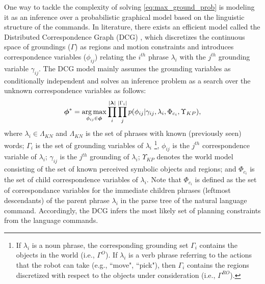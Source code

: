 One way to tackle the complexity of solving \eqref{eq:max_ground_prob} is modeling it as an inference over a probabilistic graphical model based on the linguistic structure of the commands. In literature, there exists an efficient model called the Distributed Correspondence Graph (DCG) \cite{dcg}, which discretizes the continuous space of groundings ($\Gamma$) as regions and motion constraints and introduces correspondence variables ($\phi_{ij}$) relating the $i^{th}$ phrase $\lambda_i$ with the $j^{th}$ grounding variable $\gamma_{ij}$. The DCG model mainly assumes the grounding variables as conditionally independent and solves an inference problem as a search over the unknown correspondence variables as follows: 
\begin{equation}
\label{eq:dcg_factored1}
\begin{split}
\boldsymbol{\phi}^* = \operatorname*{\arg\max}_{\phi_{ij} \in \boldsymbol{\phi}} \prod_{i}^{| \boldsymbol{\lambda}|} \prod_{j}^{|\Gamma_i|} p(\phi_{ij}|\gamma_{ij},\lambda_i, \Phi_{c_{i}}, \Upsilon_{KP}),
\end{split}
\end{equation}
where $\lambda_i \in \Lambda_{KN}$ and $\Lambda_{KN}$ is the set of phrases with known (previously seen) words; $\Gamma_i$ is the set of grounding variables of $\lambda_i$ \footnote{If $\lambda_i$ is a noun phrase, the corresponding grounding set $\Gamma_i$ contains the objects in the world (i.e., $\Gamma^O$). If $\lambda_i$ is a verb phrase referring to the actions that the robot can take (e.g., ``move", ``pick"), then $\Gamma_i$ contains the regions discretized with respect to the objects under consideration (i.e., $\Gamma^{RO}$).}, $\phi_{ij}$ is the $j^{th}$ correspondence variable of $\lambda_i$; $\gamma_{ij}$ is the $j^{th}$ grounding of $\lambda_i$; $\Upsilon_{KP}$ denotes the world model consisting of the set of known perceived symbolic objects and regions; and  $\Phi_{c_{i}}$ is the set of child correspondence variables of $\lambda_{i}$. Note that $\Phi_{c_{i}}$ is defined as the set of correspondance variables for the immediate children phrases (leftmost descendants) of the parent phrase $\lambda_i$ in the parse tree of the natural language command. Accordingly, the DCG infers the most likely set of planning constraints from the language commands.

